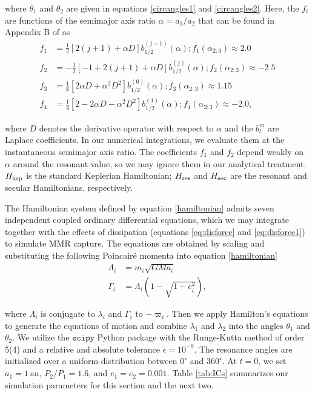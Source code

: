 \documentclass[usenatbib,twocolumn]{mnras}
\begin{document}
\noindent
where \(\theta_1\) and \(\theta_2\) are given in equations
\eqref{circangles1} and \eqref{circangles2}.
Here, the \(f_i\) are functions of the semimajor
axis ratio \(\alpha=a_1/a_2\) that can be found in Appendix B of
\citet{murray_solar_2000} as
\begin{align}
\label{coefficients}
  f_1 &= \frac12[2(j+1)+\alpha D]b_{1/2}^{(j+1)}(\alpha); f_1(\alpha_{2:3})\approx 2.0 \\
  f_2 &= -\frac12[-1+2(j+1)+\alpha D]b_{1/2}^{(j)}(\alpha);f_2(\alpha_{2:3}) \approx -2.5\\
  f_3 &= \frac18[2\alpha D + \alpha^2 D^2]b_{1/2}^{(0)}(\alpha); f_3(\alpha_{2:3})\approx 1.15\\
  f_4 &= \frac14[2-2\alpha D - \alpha^2 D^2]b_{1/2}^{(1)}(\alpha); f_4(\alpha_{2:3})\approx -2.0,
\end{align}

\noindent where \(D\) denotes the derivative operator with
respect to \(\alpha\) and the \(b_{l}^m\) are Laplace coefficients.  In
our numerical integrations, we evaluate them at the instantaneous
semimajor axis ratio.  The coefficients \(f_1\) and \(f_2\) depend weakly
on \(\alpha\) around the resonant value, so we may ignore them in our
analytical treatment. \(H_{\rm kep}\) is the standard Keplerian
Hamiltonian; \(H_{\rm res}\) and \(H_{\rm sec}\) are the resonant and secular
Hamiltonians, respectively.

The Hamiltonian system defined by equation \eqref{hamiltonian} admits
seven independent coupled ordinary differential equations, which we
may integrate together with the effects of dissipation (equations \eqref{eq:disforce}
and \eqref{eq:disforce1}) to simulate MMR
capture.  The equations are obtained by scaling and substituting the
following Poincair\'e momenta into equation
\eqref{hamiltonian}
\begin{align}
  \Lambda_i &= m_i\sqrt{GMa_i}\\
  \Gamma_i &= \Lambda_i(1-\sqrt{1-e_i^2}),
\end{align}

\noindent where \(\Lambda_i\) is conjugate to \(\lambda_i\) and
\(\Gamma_i\) to \(-\varpi_i\).  Then we apply Hamilton's equations to
generate the equations of motion and combine \(\lambda_1\) and
\(\lambda_2\) into the angles \(\theta_1\) and \(\theta_2\).  We utilize the
\(\mathtt{scipy}\) Python package with the Runge-Kutta method of order
5(4) and a relative and absolute tolerance \(\epsilon=10^{-9}\).  The
resonance angles are initialized over a uniform distribution between
\(0^\circ\) and \(360^\circ\).  At \(t=0\), we set \(a_1=1~\mathrm{au}\),
\(P_2/P_1=1.6\), and \(e_1=e_2=0.001\).  Table \ref{tab:ICs} summarizes our
simulation parameters for this section and the next two.
\end{document}
